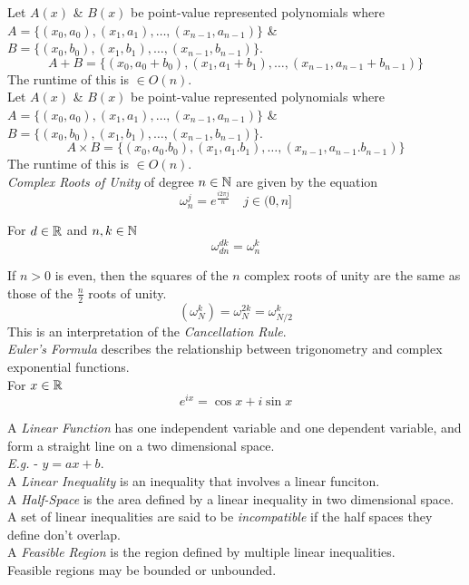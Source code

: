 \documentclass[11pt,a4paper]{article}
\begin{document}
\newpage
{}
Let $A(x)$ \& $B(x)$ be point-value represented polynomials where $A=\{(x_0,a_0),(x_1,a_1),\dots,(x_{n-1},a_{n-1})\}$ \& $B=\{(x_0,b_0),(x_1,b_1),\dots,(x_{n-1},b_{n-1})\}$.
$$A+B=\{(x_0, a_0+b_0),(x_1, a_1+b_1),\dots,(x_{n-1}, a_{n-1}+b_{n-1})\}$$
\nb The runtime of this is $\in O(n)$.\\

Let $A(x)$ \& $B(x)$ be point-value represented polynomials where $A=\{(x_0,a_0),(x_1,a_1),\dots,(x_{n-1},a_{n-1})\}$ \& $B=\{(x_0,b_0),(x_1,b_1),\dots,(x_{n-1},b_{n-1})\}$.
$$A\times B=\{(x_0, a_0.b_0),(x_1, a_1.b_1),\dots,(x_{n-1}, a_{n-1}.b_{n-1})\}$$
\nb The runtime of this is $\in O(n)$.\\

\textit{Complex Roots of Unity} of degree $n\in\mathbb{N}$ are given by the equation
$$\omega_n^j=e^{\frac{i2\pi j}{n}}\quad j\in(0,n]$$

For $d\in\mathbb{R}$ and $n,k\in\mathbb{N}$
$$\omega_{dn}^{dk}=\omega_n^k$$

If $n>0$ is even, then the squares of the $n$ complex roots of unity are the same as those of the $\frac{n}{2}$ roots of unity.
$$(\omega_N^k)=\omega_N^{2k}=\omega_{N/2}^k$$
\nb This is an interpretation of the \textit{Cancellation Rule}.\\

\textit{Euler's Formula} describes the relationship between trigonometry and complex exponential functions.\\
For $x\in\mathbb{R}$
$$e^{ix}=\cos x+i\sin x$$

A \textit{Linear Function} has one independent variable and one dependent variable, and form a straight line on a two dimensional space.\\
\textit{E.g.} - $y=ax+b$.\\

A \textit{Linear Inequality} is an inequality that involves a linear funciton.\\

A \textit{Half-Space} is the area defined by a linear inequality in two dimensional space.\\

A set of linear inequalities are said to be \textit{incompatible} if the half spaces they define don't overlap.\\

A \textit{Feasible Region} is the region defined by multiple linear inequalities.\\
Feasible regions may be bounded or unbounded.\\
\end{document}
